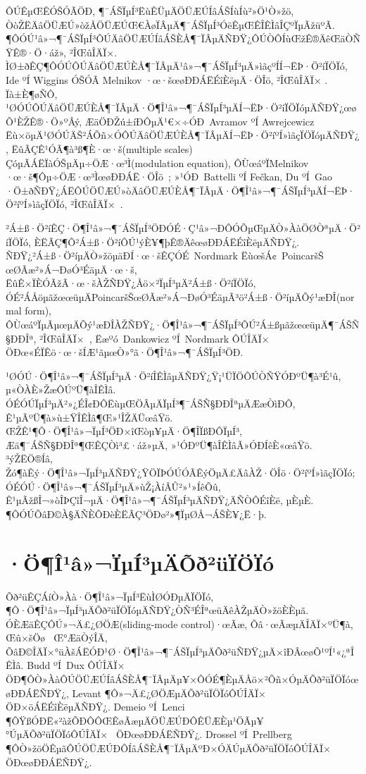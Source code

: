 \documentclass[12pt,openany,CJK,oneside]{cctbook}
\begin{document}
{ÔÚÊµŒÊÓŠÓÃÖÐ, ¶¯ÁŠÏµÍ³ËùÊÜµÄÖÜÆÚÍâÁŠÍùÍù²»Ö¹Ò»žö, ÒòŽËÄâÖÜÆÚ»òžÅÖÜÆÚŒ€ÀøÏÂµÄ¶¯ÁŠÏµÍ³ÓëÊµŒÊÎÊÌâÎÇºÏµÃžüºÃ. ¶ÔÓÚ¹â»¬¶¯ÁŠÏµÍ³ÔÚÄâÖÜÆÚÍâÁŠÈÅ¶¯ÏÂµÄÑÐŸ¿ÔÚÒÔÍùŒžÊ®ÄêŒäÒÑŸ­Ê®·Ö·áž», ²ÎŒûÎÄÏ×\;\cite{Wiggins1, Wiggins2, Wiggins3, Yagasaki}. ÌØ±ðÊÇ¶ÔÓÚÔÚÄâÖÜÆÚÈÅ¶¯ÏÂµÄ¹â»¬¶¯ÁŠÏµÍ³µÄ»ìãçºÍÍ¬ËÞ·Ö²íÏÖÏó, Ide ºÍ \;Wiggins ÓŠÓÃ \;Melnikov ·œ·šœøÐÐÁËÉîÈëµÄ·ÖÎö, ²ÎŒûÎÄÏ× \;\cite{Wiggins1, Wiggins2, Wiggins3}. Ïà±È¶øÑÔ, ¹ØÓÚÔÚÄâÖÜÆÚÈÅ¶¯ÏÂµÄ·Ö¶Î¹â»¬¶¯ÁŠÏµÍ³µÄÍ¬ËÞ·Ö²íÏÖÏóµÄÑÐŸ¿œøÕ¹ÈŽÊ®·Ö»ºÂý, ÆäÖÐŽú±íÐÔµÄ¹€×÷ÓÐ\ Avramov ºÍ \;Awrejcewicz Ëù×öµÄ¹ØÓÚÄŠ²ÁÕñ×ÓÔÚÄâÖÜÆÚÈÅ¶¯ÏÂµÄÍ¬ËÞ·Ö²íºÍ»ìãçÏÖÏóµÄÑÐŸ¿, ËûÃÇÊ¹ÓÃ¶à³ß¶È·œ·š(multiple scales) ÇóµÃÁËÏàÓŠµÄµ÷ÖÆ·œ³Ì(modulation equation), ÔÙœáºÏ\;Melnikov ·œ·š¶Ôµ÷ÖÆ·œ³ÌœøÐÐÁË·ÖÎö\ \cite{Avramov}; »¹ÓÐ\ Battelli ºÍ \;Fe\v{c}kan, Du ºÍ\ Gao ·Ö±ðÑÐŸ¿ÁËÔÚÖÜÆÚ»òÄâÖÜÆÚÈÅ¶¯ÏÂµÄ·Ö¶Î¹â»¬¶¯ÁŠÏµÍ³µÄÍ¬ËÞ·Ö²íºÍ»ìãçÏÖÏó, ²ÎŒûÎÄÏ×\ \cite{Battelli1, Battelli2, Battelli3, Battelli4, Battelli6, Feckan1, Gao}.

²Á±ß·Ö²íÊÇ·Ö¶Î¹â»¬¶¯ÁŠÏµÍ³ÖÐÓÉ·Ç¹â»¬ÐÔÓÕµŒµÄÒ»ÀàÖØÒªµÄ·Ö²íÏÖÏó, ÈËÃÇ¶Ô²Á±ß·Ö²íÔÚ¹ýÈ¥¶þÊ®ÄêœøÐÐÁËÉîÈëµÄÑÐŸ¿. ÑÐŸ¿²Á±ß·Ö²íµÄÒ»žöµäÐÍ·œ·šÊÇÓÉ\ Nordmark ËùœšÁ¢\ PoincaršŠ œØÃæ²»Á¬ÐøÓ³ÉäµÄ·œ·š, ËûÊ×ÏÈÓÃžÃ·œ·šÀŽÑÐŸ¿Åö×²ÏµÍ³µÄ²Á±ß·Ö²íÏÖÏó, ÓÉ²ÁÅöµãžœœüµÄPoincaršŠœØÃæ²»Á¬ÐøÓ³ÉäµÃ³ö²Á±ß·Ö²íµÄÕý¹æÐÎ(normal form), ÔÙœáºÏµÃµœµÄÕý¹æÐÎÀŽÑÐŸ¿·Ö¶Î¹â»¬¶¯ÁŠÏµÍ³ÔÚ²Á±ßµãžœœüµÄ¶¯ÁŠÑ§ÐÐÎª, ²ÎŒûÎÄÏ×\ \cite{Nordmark1}, Ëæºó\ Dankowicz ºÍ\ Nordmark ÔÚÎÄÏ×\ \cite{Dankowicz2} ÖÐœ«ÉÏÊö·œ·šÍÆ¹ãµœÒ»°ã·Ö¶Î¹â»¬¶¯ÁŠÏµÍ³ÖÐ.

¹ØÓÚ·Ö¶Î¹â»¬¶¯ÁŠÏµÍ³µÄ·Ö²íÎÊÌâµÄÑÐŸ¿Ÿ¡¹ÜÏÖÔÚÒÑŸ­ÓÐºÜ¶à³É¹û, µ«ÒÀÈ»ŽæÔÚºÜ¶àÎÊÌâ. ÓÉÓÚÏµÍ³µÄ²»¿ÉÎ¢ÐÔËùµŒÖÂµÄÏµÍ³¶¯ÁŠÑ§ÐÐÎªµÄÆæÒìÐÔ, Ê¹µÃºÜ¶à»ù±ŸÎÊÌâ¶Œ»¹ÎŽÄÜœâŸö. ŒŽÊ¹¶Ô·Ö¶Î¹â»¬ÏµÍ³ÖÐ×îŒòµ¥µÄ·Ö¶ÎÏßÐÔÏµÍ³, Æä¶¯ÁŠÑ§ÐÐÎª¶ŒÊÇÒì³£·áž»µÄ, »¹ÓÐºÜ¶àÎÊÌâÃ»ÓÐÍêÈ«œâŸö. ³ýŽËÖ®Íâ, Žó¶àÊý·Ö¶Î¹â»¬ÏµÍ³µÄÑÐŸ¿ŸÖÏÞÓÚÓÃÊýÖµÄ£ÄâÀŽ·ÖÎö·Ö²íºÍ»ìãçÏÖÏó; ÓÉÓÚ·Ö¶Î¹â»¬¶¯ÁŠÏµÍ³µÄ»ùŽ¡ÀíÂÛ²»¹»ÍêÕû, Ê¹µÃžßÎ¬»òÎÞÇîÎ¬µÄ·Ö¶Î¹â»¬¶¯ÁŠÏµÍ³µÄÑÐŸ¿ÄÑÒÔÉîÈë, µÈµÈ. ¶ÔÓÚÕâÐ©À§ÄÑÈÔÐèÈËÃÇ³ÖÐø²»¶ÏµØÅ¬ÁŠÈ¥¿Ë·þ.

\section{\kaishu ·Ö¶Î¹â»¬ÏµÍ³µÄÕð²üÏÖÏó}

Õð²üÊÇÁíÒ»Àà·Ö¶Î¹â»¬ÏµÍ³ËùÌØÓÐµÄÏÖÏó, ¶Ô·Ö¶Î¹â»¬ÏµÍ³µÄÕð²üÏÖÏóµÄÑÐŸ¿ÒÑ³ÉÎªœüÄêÀŽµÄÒ»žöÈÈµã. ÓÈÆäÊÇÔÚ»¬Ä£¿ØÖÆ(sliding-mode control)·œÃæ, Õâ·œÃæµÄÎÄÏ×ºÜ¶à, Œû×šÖø\ \cite{BartoliniF,BartoliniP} Œ°ÆäÒýÎÄ, ÕâÐ©ÎÄÏ×°üÀšÁËÓÐ¹Ø·Ö¶Î¹â»¬¶¯ÁŠÏµÍ³µÄÕð²üÑÐŸ¿µÄ×îÐÂœøÕ¹ºÍ¹«¿ªÎÊÌâ. Budd ºÍ\ Dux ÔÚÎÄÏ×\ \cite{BuddD} ÖÐ¶ÔÒ»ÀàÔÚÖÜÆÚÍâÁŠÈÅ¶¯ÏÂµÄµ¥×ÔÓÉ¶ÈµÄÅö×²Õñ×ÓµÄÕð²üÏÖÏóœøÐÐÁËÑÐŸ¿, Levant ¶Ô»¬Ä£¿ØÖÆµÄÕð²üÏÖÏóÔÚÎÄÏ×\ \cite{Levant} ÖÐ×öÁËÉîÈëµÄÑÐŸ¿. Demeio ºÍ\ Lenci ¶ÔŸßÓÐË«²àžÕÐÔÔŒÊøÃæµÄÖÜÆÚÐÔÊÜÆÈµ¹ÖÃµ¥°ÚµÄÕð²üÏÖÏóÔÚÎÄÏ×\ \cite{DemeioL} ÖÐœøÐÐÁËÑÐŸ¿. Drossel ºÍ\ Prellberg ¶ÔÒ»žöÖÊµãÔÚÖÜÆÚÐÔÍâÁŠÈÅ¶¯ÏÂµÄºÐ×ÓÄÚµÄÕð²üÏÖÏóÔÚÎÄÏ×\ \cite{Drossel} ÖÐœøÐÐÁËÑÐŸ¿.

}
\end{document}
